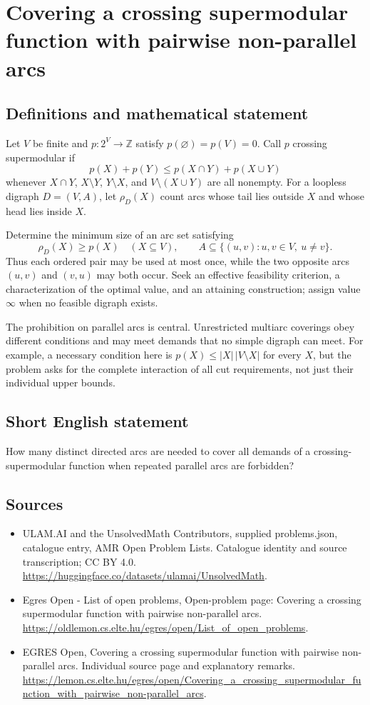 \documentclass[11pt,a4paper]{article}
\begin{document}
\section*{Covering a crossing supermodular function with pairwise non-parallel arcs}\label{statement}

\subsection{Definitions and mathematical statement}
Let $V$ be finite and $p:2^V\to\mathbb Z$ satisfy
$p(\varnothing)=p(V)=0$. Call $p$ crossing supermodular if
\[
                 p(X)+p(Y)\le p(X\cap Y)+p(X\cup Y)
\]
whenever $X\cap Y$, $X\setminus Y$, $Y\setminus X$, and
$V\setminus(X\cup Y)$ are all nonempty.
For a loopless digraph $D=(V,A)$, let $\rho_D(X)$ count arcs whose
tail lies outside $X$ and whose head lies inside $X$.

Determine the minimum size of an arc set satisfying
\[
 \rho_D(X)\ge p(X)\quad(X\subseteq V),\qquad
 A\subseteq\{(u,v):u,v\in V,\ u\ne v\}.
\]
Thus each ordered pair may be used at most once, while the two opposite
arcs $(u,v)$ and $(v,u)$ may both occur. Seek an effective feasibility
criterion, a characterization of the optimal value, and an attaining
construction; assign value $\infty$ when no feasible digraph exists.

The prohibition on parallel arcs is central. Unrestricted multiarc
coverings obey different conditions and may meet demands that no
simple digraph can meet. For example, a necessary condition here is
$p(X)\le |X|\,|V\setminus X|$ for every $X$, but the problem asks for
the complete interaction of all cut requirements, not just their
individual upper bounds.
\subsection{Short English statement}
How many distinct directed arcs are needed to cover all demands
of a crossing-supermodular function when repeated parallel arcs are forbidden?
\subsection{Sources}
\begin{itemize}
\item[S1] ULAM.AI and the UnsolvedMath Contributors, supplied problems.json, catalogue entry, AMR Open Problem Lists. Catalogue identity and source transcription; CC BY 4.0.
\url{https://huggingface.co/datasets/ulamai/UnsolvedMath}.
\item[S2] Egres Open - List of open problems, Open-problem page: Covering a crossing supermodular function with pairwise non-parallel arcs. 
\url{https://oldlemon.cs.elte.hu/egres/open/List_of_open_problems}.
\item[S3] EGRES Open, Covering a crossing supermodular function with pairwise non-parallel arcs. Individual source page and explanatory remarks.
\url{https://lemon.cs.elte.hu/egres/open/Covering_a_crossing_supermodular_function_with_pairwise_non-parallel_arcs}.
\end{itemize}
\end{document}

